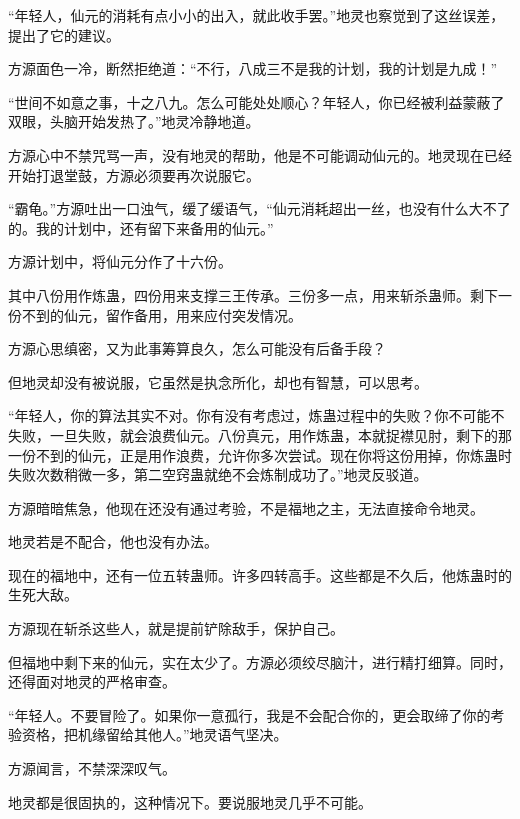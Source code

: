 
\begin{this_body}



“年轻人，仙元的消耗有点小小的出入，就此收手罢。”地灵也察觉到了这丝误差，提出了它的建议。

方源面色一冷，断然拒绝道：“不行，八成三不是我的计划，我的计划是九成！”

“世间不如意之事，十之八九。怎么可能处处顺心？年轻人，你已经被利益蒙蔽了双眼，头脑开始发热了。”地灵冷静地道。

方源心中不禁咒骂一声，没有地灵的帮助，他是不可能调动仙元的。地灵现在已经开始打退堂鼓，方源必须要再次说服它。

“霸龟。”方源吐出一口浊气，缓了缓语气，“仙元消耗超出一丝，也没有什么大不了的。我的计划中，还有留下来备用的仙元。”

方源计划中，将仙元分作了十六份。

其中八份用作炼蛊，四份用来支撑三王传承。三份多一点，用来斩杀蛊师。剩下一份不到的仙元，留作备用，用来应付突发情况。

方源心思缜密，又为此事筹算良久，怎么可能没有后备手段？

但地灵却没有被说服，它虽然是执念所化，却也有智慧，可以思考。

“年轻人，你的算法其实不对。你有没有考虑过，炼蛊过程中的失败？你不可能不失败，一旦失败，就会浪费仙元。八份真元，用作炼蛊，本就捉襟见肘，剩下的那一份不到的仙元，正是用作浪费，允许你多次尝试。现在你将这份用掉，你炼蛊时失败次数稍微一多，第二空窍蛊就绝不会炼制成功了。”地灵反驳道。

方源暗暗焦急，他现在还没有通过考验，不是福地之主，无法直接命令地灵。

地灵若是不配合，他也没有办法。

现在的福地中，还有一位五转蛊师。许多四转高手。这些都是不久后，他炼蛊时的生死大敌。

方源现在斩杀这些人，就是提前铲除敌手，保护自己。

但福地中剩下来的仙元，实在太少了。方源必须绞尽脑汁，进行精打细算。同时，还得面对地灵的严格审查。

“年轻人。不要冒险了。如果你一意孤行，我是不会配合你的，更会取缔了你的考验资格，把机缘留给其他人。”地灵语气坚决。

方源闻言，不禁深深叹气。

地灵都是很固执的，这种情况下。要说服地灵几乎不可能。


\end{this_body}
